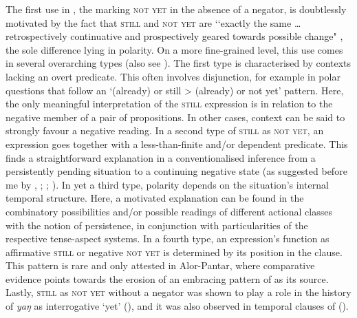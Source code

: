 The first use in , the marking \textsc{not yet} in the absence of a negator, is doubtlessly motivated by the fact that \textsc{still} and \textsc{not yet} are \lq\lq exactly the same … retrospectively continuative and prospectively geared towards possible change" \parencite[40]{vanderAuwera1998}, the sole difference lying in polarity. On a more fine-grained level, this use comes in several overarching types (also see \cite{PersohnNotYet}). The first type is characterised by contexts lacking an overt predicate. This often involves disjunction, for example in polar questions that follow an \lq (already) or still > (already) or not yet\rq{ }pattern. Here, the only meaningful interpretation of the  \textsc{still} expression is in relation to the negative member of a pair of propositions. In other cases, context can be said to strongly favour a negative reading. In a second type of \textsc{still} as \textsc{not yet}, an expression goes together with a less-than-finite and/or dependent predicate. This finds a straightforward explanation in a conventionalised inference from a persistently pending situation to a continuing negative state (as suggested before me by \cite{Gueldemann1996}, \citeyear[129–130]{Gueldemann1998}; \cite[148]{Nurse2008}; \cite{VeselinovaDevos2021}). In yet a third type, polarity depends on the situation's internal temporal structure. Here, a motivated explanation can be found in the combinatory possibilities and/or possible readings of different actional classes with the notion of persistence, in conjunction with particularities of the respective tense-aspect systems. In a fourth type, an expression's function as affirmative \textsc{still} or negative \textsc{not yet} is determined by its position in the clause. This pattern is rare and only attested in Alor-Pantar, where comparative evidence points towards the erosion of an embracing pattern of  as its source. Lastly, \textsc{still} as \textsc{not yet} without a negator was shown to play a role in the history of  \textit{yaŋ} as interrogative \lq{}yet\rq{ }(), and it was also observed in temporal clauses of  ().

